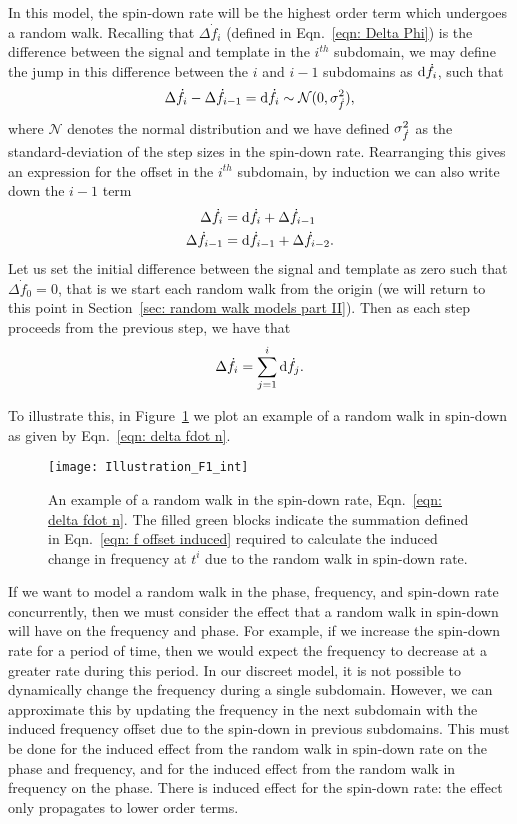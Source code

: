 \documentclass[../full_thesis/full_thesis.tex]{subfiles}
\begin{document}
In this model, the spin-down rate will be the highest order term which
undergoes a random walk. Recalling that $\Delta \dot{f}_i$ (defined in
Eqn.~\eqref{eqn: Delta Phi}) is the difference between the signal and template
in the $i^{th}$ subdomain, we may define the jump in this difference between
the $i$ and $i-1$ subdomains as $\mathrm{d} \dot{f}_i$, such that
\begin{equation}
\Delta \dot{f}_{i} - \Delta\dot{f}_{i-1} = \mathrm{d} \dot{f}_{i} \sim \mathcal{N}(0, \sigma_{\dot{f}}^{2}),
\end{equation}
where $\mathcal{N}$ denotes the normal distribution and we have defined $\sigma_{\dot{f}}^{2}$
as the standard-deviation of the step sizes in the spin-down rate. Rearranging
this gives an expression for the offset in the
$i^{th}$ subdomain, by induction we can also write down the $i-1$ term
\begin{align}
\Delta\dot{f}_{i} &  = \mathrm{d}\dot{f}_{i} + \Delta\dot{f}_{i-1}  \\
\Delta\dot{f}_{i-1} &  = \mathrm{d}\dot{f}_{i-1} + \Delta\dot{f}_{i-2}  .
\end{align}
Let us set the initial difference between the signal and template as zero such
that $\Delta\dot{f}_0=0$, that is we start each random walk from the origin
(we will return to this point in Section~\ref{sec: random walk models part
II}). Then as each step proceeds from the previous step, we have that
\begin{equation} 
\Delta\dot{f}_{i} = \sum_{j=1}^{i}\mathrm{d}\dot{f}_{j}.
\label{eqn: delta fdot n} 
\end{equation}

To illustrate this, in Figure~\ref{fig: Illustration fdot int} we plot an example
of a random walk in spin-down as given by Eqn.~\eqref{eqn: delta fdot n}.
\begin{figure}[ht]
\centering
\texttt{[image: Illustration\_F1\_int]}
\caption{An example of a random walk in the spin-down rate, 
Eqn.~\eqref{eqn: delta fdot n}. The filled green blocks indicate the
summation defined in Eqn.~\eqref{eqn: f offset induced} required to
calculate the induced change in frequency at $t^{i}$ due to the random walk in
spin-down rate.}
\label{fig: Illustration fdot int}
\end{figure}

If we want to model a random walk in the phase, frequency, and spin-down rate
concurrently, then we must consider the effect that a
random walk in spin-down will have on the frequency and phase. For example, if we
increase the spin-down rate for a period of time, then we would expect the frequency
to decrease at a greater rate during this period. In our discreet model, it is
not possible to dynamically change the frequency during a single subdomain.
However, we can approximate this by updating the frequency in the next
subdomain with the induced frequency offset due to the spin-down in previous
subdomains. This must be done for the induced effect from the random walk in spin-down rate on
the phase and frequency, and for the induced effect from the random walk in frequency
on the phase. There is induced effect for the spin-down rate: the effect only
propagates to lower order terms.
\end{document}
